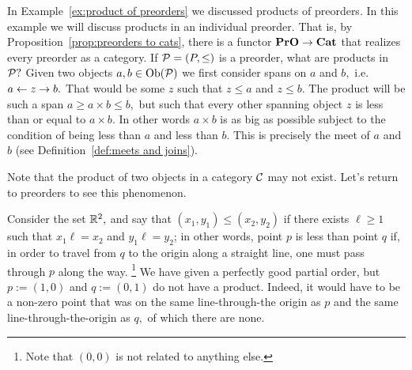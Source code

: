 \documentclass[../main/CT4S-EN-RU]{subfiles}
\begin{document}
\begin{remarkRUS}\label{rem:gateway}
\end{remarkRUS}

\begin{exampleENG}
In Example~\ref{ex:product of preorders} we discussed products of preorders. In this example we will discuss products in an individual preorder. That is, by Proposition~\ref{prop:preorders to cats}, there is a functor ${\mathbf{PrO}}\rightarrow{\mathbf{Cat}}$ that realizes every preorder as a category. If $\mathcal{P}=(P,\leq)$ is a preorder, what are products in $\mathcal{P}?$ Given two objects $a,b\in\operatorname{Ob}(\mathcal{P})$ we first consider spans on $a$ and $b,$ i.e. $a\leftarrow z\rightarrow b.$ That would be some $z$ such that $z\leq a$ and $z\leq b.$ The product will be such a span $a\geq a\times b\leq b,$ but such that every other spanning object $z$ is less than or equal to $a\times b.$ In other words $a\times b$ is as big as possible subject to the condition of being less than $a$ and less than $b.$ This is precisely the meet of $a$ and $b$ (see Definition~\ref{def:meets and joins}). 
\end{exampleENG}

\begin{exampleRUS}
\end{exampleRUS}

\begin{exampleENG}\label{ex:products dont exist}
Note that the product of two objects in a category $\mathcal{C}$ may not exist. Let's return to preorders to see this phenomenon.

Consider the set ${\mathbb R}^2,$ and say that $(x_1,y_1)\leq (x_2,y_2)$ if there exists $\ell\geq 1$ such that $x_1\ell=x_2$ and $y_1\ell=y_2$; in other words, point $p$ is less than point $q$ if, in order to travel from $q$ to the origin along a straight line, one must pass through $p$ along the way. 
\footnote{Note that $(0,0)$ is not related to anything else.} 
We have given a perfectly good partial order, but $p:=(1,0)$ and $q:=(0,1)$ do not have a product. Indeed, it would have to be a non-zero point that was on the same line-through-the origin as $p$ and the same line-through-the-origin as $q,$ of which there are none.
\end{exampleENG}

\begin{exampleRUS}\label{ex:products dont exist}
\end{exampleRUS}
\end{document}
